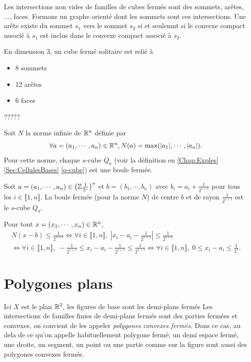 Les intersections non vides de familles de cubes fermés sont des sommets, arêtes, ..., faces. Formons un graphe orienté dont les sommets sont ces intersections. Une arête existe du sommet $s_1$ vers le sommet $s_2$ si et seulemnt si le convexe compact associé à $s_1$ est inclus dans le convexe compact associé à $s_2$.

En dimension 3, un cube fermé solitaire est relié à
\begin{itemize}
 \item 8 sommets
 \item 12 arêtes
 \item 6 faces
\end{itemize}
?????

Soit $N$ la norme infinie de $\mathbb{R}^n$ définie par
\begin{displaymath}
 \forall a =(a_1, \cdots, a_n) \in \mathbb{R}^n, N(a) = \max(|a_1|, \cdots ,|a_n|).
\end{displaymath}
Pour cette norme, chaque $s$-cube $Q_a$ (voir la définition en \ref{Chap:Exples}\ref{Sec:CellulesBases} \ref{q-cube}) est une boule fermée.
\begin{propn}
Soit $a =(a_1, \cdots, a_n) \in \left(\mathbb{Z}\frac{1}{2^s}\right)^n$ et $b=(b_1,\cdots,b_n)$ avec $b_i = a_i + \frac{1}{2^{s+1}}$ pour tous les $i\in \llbracket 1,n\rrbracket$.\newline
La boule fermée (pour la norme $N$) de centre $b$ et de rayon $\frac{1}{2^{s+1}}$ est le $s$-cube $Q_a$.
\end{propn}
\begin{demo}
 Pour tout $x =(x_1, \cdots, x_n) \in \mathbb{R}^n$,
\begin{multline*}
 N(x-b)\leq \frac{1}{2^{s+1}}
 \Leftrightarrow
 \forall i \in \llbracket 1, n\rrbracket, \; \left|x_i - a_i - \frac{1}{2^{s+1}} \right| \leq \frac{1}{2^{s+1}} \\
 \Leftrightarrow
 \forall i \in \llbracket 1, n\rrbracket, \; -\frac{1}{2^{s+1}} \leq x_i - a_i - \frac{1}{2^{s+1}} \leq \frac{1}{2^{s+1}}
 \Leftrightarrow
 \forall i \in \llbracket 1, n\rrbracket, \; 0 \leq x_i - a_i \leq \frac{1}{2^{s}}.
\end{multline*}
\end{demo}


\section{Polygones plans}\label{ExplePolyg}
Ici $X$ est le plan $\mathbb{R}^2$, les figures de base sont les demi-plans fermés Les intersections de familles finies de demi-plans fermés sont des parties fermées et convexes, on convient de les appeler \emph{polygones convexes fermés}. Dans ce cas, au dela de ce qu'on appelle habituellement polygone fermé; un demi espace fermé, une droite, un segment, un point ou une partie comme sur la figure sont aussi des polygones convexes fermés.

